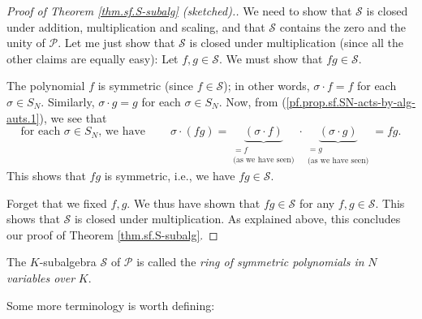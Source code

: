 \begin{fineprint}
\begin{proof}
[Proof of Theorem \ref{thm.sf.S-subalg} (sketched).]We need to show that
$\mathcal{S}$ is closed under addition, multiplication and scaling, and that
$\mathcal{S}$ contains the zero and the unity of $\mathcal{P}$. Let me just
show that $\mathcal{S}$ is closed under multiplication (since all the other
claims are equally easy): Let $f,g\in\mathcal{S}$. We must show that
$fg\in\mathcal{S}$.

The polynomial $f$ is symmetric (since $f\in\mathcal{S}$); in other words,
$\sigma\cdot f=f$ for each $\sigma\in S_{N}$. Similarly, $\sigma\cdot g=g$ for
each $\sigma\in S_{N}$. Now, from (\ref{pf.prop.sf.SN-acts-by-alg-auts.1}), we
see that%
\[
\text{for each }\sigma\in S_{N}\text{, we have}\ \ \ \ \ \ \ \ \ \ \sigma
\cdot\left(  fg\right)  =\underbrace{\left(  \sigma\cdot f\right)
}_{\substack{=f\\\text{(as we have seen)}}}\cdot\underbrace{\left(
\sigma\cdot g\right)  }_{\substack{=g\\\text{(as we have seen)}}}=fg.
\]
This shows that $fg$ is symmetric, i.e., we have $fg\in\mathcal{S}$.

Forget that we fixed $f,g$. We thus have shown that $fg\in\mathcal{S}$ for any
$f,g\in\mathcal{S}$. This shows that $\mathcal{S}$ is closed under
multiplication. As explained above, this concludes our proof of Theorem
\ref{thm.sf.S-subalg}.
\end{proof}
\end{fineprint}

\begin{definition}
\label{def.sf.ring-of-symm}The $K$-subalgebra $\mathcal{S}$ of $\mathcal{P}$
is called the \emph{ring of symmetric polynomials in }$N$\emph{ variables over
}$K$.
\end{definition}

Some more terminology is worth defining:

